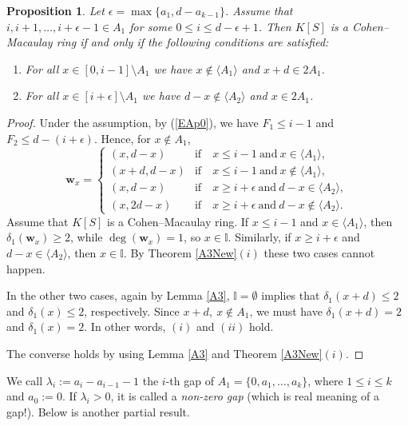 \documentclass[11pt]{article}
\newtheorem{Proposition}[Theorem]{Proposition}
\def\deg{\operatorname{deg}}
\def\wbf{{\mathbf w}}
\def\Iset{{\mathbb I}}
\theoremstyle{remark}
\theoremstyle{definition}
\begin{document}
\begin{Proposition} \label{A3Add} Let $\epsilon = \max\{a_1, d-a_{k-1}\}$.  Assume that  $i, i+1,\ldots, i+\epsilon -1  \in A_1$ for some $0\leq i \leq d-\epsilon + 1$. Then $K[S]$ is a Cohen--Macaulay ring if and only if the following conditions are satisfied:
\begin{enumerate}[\((i)\)]
    \item For all $x \in [0,i-1]\setminus A_1$ we have $x\not\in \langle A_1\rangle$ and $x+d \in 2A_1$.
    \item For all $x \in [i+\epsilon]\setminus A_1$ we have  $d-x\not\in \langle A_2\rangle$ and $x \in 2A_1$.
\end{enumerate}
\end{Proposition}

\begin{proof} Under the assumption, by (\ref{EAp0}), we have $F_1 \leq i-1$ and $F_2 \leq d- (i+\epsilon)$. Hence, for $x\not\in A_1$,
$$\wbf_x = \begin{cases}
(x, d-x) & \text{if}\quad x\leq i-1 \ \text{and}\ x\in \langle A_1\rangle,\\
(x+d, d-x)  & \text{if}\quad x\leq i-1 \ \text{and}\ x \not\in \langle A_1\rangle,\\
(x, d-x)  & \text{if}\quad x\geq i+\epsilon \ \text{and}\ d-x\in \langle A_2\rangle,\\
(x, 2d-x)  & \text{if}\quad x\geq i+\epsilon \ \text{and}\ d-x \not\in \langle A_2\rangle.
\end{cases}$$
Assume that $K[S]$ is a Cohen--Macaulay ring.
 If $x\leq i-1$ and $ x\in \langle A_1\rangle$, then $\delta_1(\wbf_x) \geq 2$, while $\deg(\wbf_x) = 1$, so $x\in \Iset$. Similarly, if $x\geq i+\epsilon$ and $ d- x\in \langle A_2\rangle$, then $x\in \Iset$. By  Theorem \ref{A3New}\((i)\) these two cases cannot happen.
 
  In the other two cases, again by Lemma \ref{A3},   $\Iset = \emptyset$ implies that $\delta_1 (x+d) \leq 2$ and $\delta_1(x)\leq 2$, respectively. Since $x+d,\ x\not\in A_1$, we must have  $\delta_1 (x+d) = 2$ and $\delta_1(x)=  2$. In other words, \((i)\) and \((ii)\) hold.
  
  The converse holds by using Lemma \ref{A3} and Theorem \ref{A3New}\((i)\).
\end{proof}

We call $\lambda_i := a_i - a_{i-1} - 1$ the $i$-th gap of $A_1 = \{0,  a_1,\ldots,a_k\}$, where $1\le i\le k$  and $a_0 := 0$. If $\lambda_i > 0$, it is called a {\it  non-zero gap} (which is real meaning of a gap!). Below is another partial result.
\end{document}
